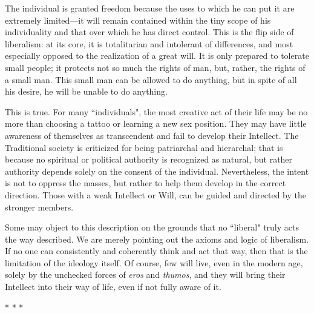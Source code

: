 \begin{quotex}
The individual is granted freedom because the uses to which he can put it are extremely limited—it
will remain contained within the tiny scope of his individuality and that over which he has direct control. This is the
flip side of liberalism: at its core, it is totalitarian and intolerant of differences, and most especially opposed to
the realization of a great will. It is only prepared to tolerate small people; it protects not so much the rights of
man, but, rather, the rights of a small man. This small man can be allowed to do anything, but in spite of all his
desire, he will be unable to do anything. 

\end{quotex}
This is true. For many ``individuals", the most creative act of their life may be no more than choosing a tattoo or
learning a new sex position. They may have little awareness of themselves as transcendent and fail to develop their
Intellect. The Traditional society is criticized for being patriarchal and hierarchal; that is because no spiritual or
political authority is recognized as natural, but rather authority depends solely on the consent of the individual.
Nevertheless, the intent is not to oppress the masses, but rather to help them develop in the correct direction. Those
with a weak Intellect or Will, can be guided and directed by the stronger members.

Some may object to this description on the grounds that no ``liberal" truly acts the way described. We are merely
pointing out the axioms and logic of liberalism. If no one can consistently and coherently think and act that way, then
that is the limitation of the ideology itself. Of course, few will live, even in the modern age, solely by the
unchecked forces of \emph{eros} and \emph{thumos}, and they will bring their Intellect into their way of life, even if
not fully aware of it.




\begin{center}* * *\end{center}

